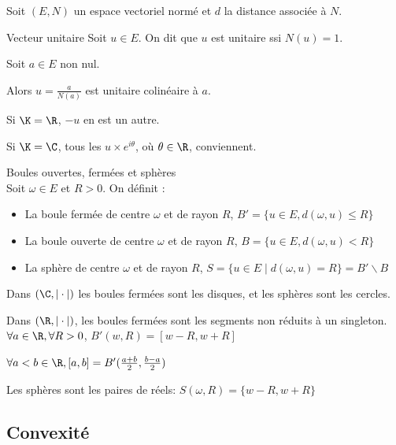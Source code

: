 Soit $(E, N)$ un espace vectoriel normé et $d$ la distance associée à $N$. 


\begin{definition}{Vecteur unitaire}{}
    Soit $u \in E$. On dit que $u$ est unitaire ssi $N(u) = 1$.
\end{definition}

\begin{exemple}
    Soit $a \in E$ non nul. 

    Alors $u = \frac{a }{N(a)}$ est unitaire colinéaire à $a$. 

    Si $\K = \R$, $-u$ en est un autre. 

    Si $\K = \C$, tous les $u \times e^{i \theta}$, où $\theta \in \R$, conviennent. 
\end{exemple}

\begin{definition}{Boules ouvertes, fermées et sphères}{}
    \\Soit $\omega \in E$ et $R > 0$. On définit : 
    \begin{itemize}
        \item La boule fermée de centre $\omega$ et de rayon $R$, $B' = \{u \in E, d(\omega, u) \leqslant R\}$
        \item La boule ouverte de centre $\omega$ et de rayon $R$, $B = \{u \in E, d(\omega, u) < R\}$
        \item La sphère de centre $\omega$ et de rayon $R$, $S = \{u \in E \mid d(\omega, u) = R\} = B' \backslash B$
    \end{itemize}  
\end{definition}

\begin{exemple}
    Dans $(\C, |\cdot|)$ les boules fermées sont les disques, et les sphères sont les cercles. 

    Dans $(\R, |\cdot|)$, les boules fermées sont les segments non 
    réduits à un singleton. \\
    
    $\forall a \in \R, \forall R > 0$, $B'(w, R) = \left[w - R, w + R\right]$

    $\forall a < b \in \R, \left[a, b \right] = B'(\frac{a + b} 2, \frac{b - a} 2)$

    Les sphères sont les paires de réels: $S(\omega, R) = \{w - R, w + R\}$
\end{exemple}

\subsection{Convexité}

